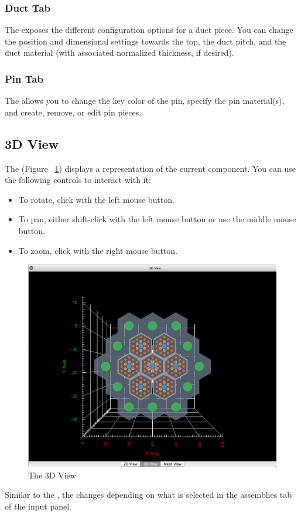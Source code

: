 \subsubsection{Duct Tab}
The  exposes the different configuration options for a duct piece.  You can change the position and dimensional settings towards the top, the duct pitch, and the duct material (with associated normalized thickness, if desired).

\subsubsection{Pin Tab}
The  allows you to change the key color of the pin, specify the pin material(s), and create, remove, or edit pin pieces.

\subsection{3D View}
The  (Figure ~\ref{fig:3DView}) displays a representation of the current component.  You can use the following controls to interact with it:

\begin{itemize}
	\item{To rotate, click with the left mouse button.}
	\item{To pan, either shift-click with the left mouse button or use the middle mouse button.}
	\item{To zoom, click with the right mouse button.}
\end{itemize}

\begin{figure}[h]
	\begin{center}
		\includegraphics[width=0.5\linewidth]{Images/3DView.png}
		\caption{The 3D View}
		\label{fig:3DView}
	\end{center}
\end{figure}

Similar to the , the  changes depending on what is selected in the assemblies tab of the input panel.

